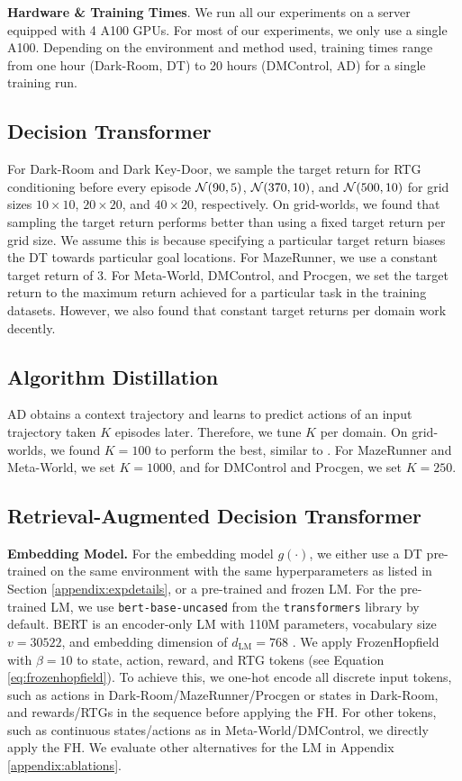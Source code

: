 \textbf{Hardware \& Training Times}.
We run all our experiments on a server equipped with 4 A100 GPUs.
For most of our experiments, we only use a single A100.
Depending on the environment and method used, training times range from one hour (Dark-Room, DT) to 20 hours (DMControl, AD) for a single training run. 


\subsection{Decision Transformer}\label{appendix:dt}
For Dark-Room and Dark Key-Door, we sample the target return for RTG conditioning before every episode $\mathcal{N}(90,5)$, $\mathcal{N}(370,10)$, and $\mathcal{N}(500,10)$ for grid sizes $10\times10$,  $20\times20$, and $40\times20$, respectively.
On grid-worlds, we found that sampling the target return performs better than using a fixed target return per grid size. 
We assume this is because specifying a particular target return biases the DT towards particular goal locations.
For MazeRunner, we use a constant target return of 3. 
For Meta-World, DMControl, and Procgen, we set the target return to the maximum return achieved for a particular task in the training datasets. 
However, we also found that constant target returns per domain work decently.


\subsection{Algorithm Distillation}
AD obtains a context trajectory and learns to predict actions of an input trajectory taken $K$ episodes later.
Therefore, we tune $K$ per domain. 
On grid-worlds, we found $K=100$ to perform the best, similar to \citet{Lee:23}.
For MazeRunner and Meta-World, we set $K=1000$, and for DMControl and Procgen, we set $K=250$.


\subsection{Retrieval-Augmented Decision Transformer}\label{appendix:radt-details}
\textbf{Embedding Model.} 
For the embedding model $g(\cdot)$, we either use a DT pre-trained on the same environment with the same hyperparameters as listed in Section \ref{appendix:expdetails}, or a pre-trained and frozen LM. 
For the pre-trained LM, we use \texttt{bert-base-uncased} from the \texttt{transformers} library by default. 
BERT is an encoder-only LM with 110M parameters, vocabulary size $v=30522$, and embedding dimension of $d_{\text{LM}}=768$ \citep{Devlin:18}.
We apply FrozenHopfield with $\beta=10$ to state, action, reward, and RTG tokens (see Equation \ref{eq:frozenhopfield}). 
To achieve this, we one-hot encode all discrete input tokens, such as actions in Dark-Room/MazeRunner/Procgen or states in Dark-Room, and rewards/RTGs in the sequence before applying the FH.
For other tokens, such as continuous states/actions as in Meta-World/DMControl, we directly apply the FH. 
We evaluate other alternatives for the LM in Appendix \ref{appendix:ablations}.

